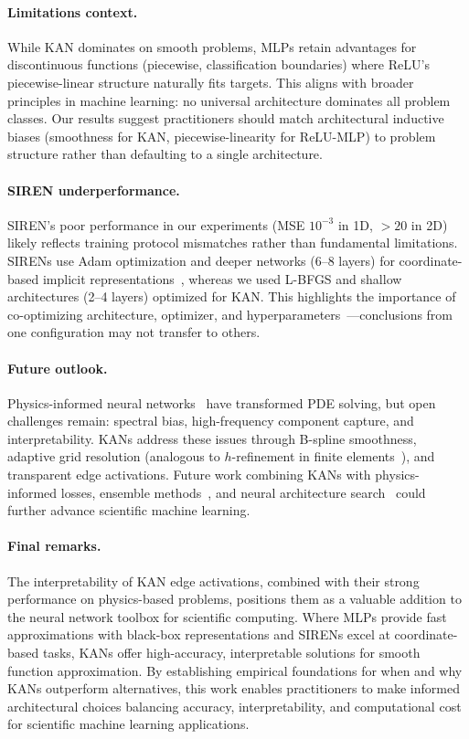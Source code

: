 \documentclass[11pt,a4paper]{article}
\begin{document}
\paragraph{Limitations context.} While KAN dominates on smooth problems, MLPs retain advantages for discontinuous functions (piecewise, classification boundaries) where ReLU's piecewise-linear structure naturally fits targets. This aligns with broader principles in machine learning: no universal architecture dominates all problem classes. Our results suggest practitioners should match architectural inductive biases (smoothness for KAN, piecewise-linearity for ReLU-MLP) to problem structure rather than defaulting to a single architecture.

\paragraph{SIREN underperformance.} SIREN's poor performance in our experiments (MSE $10^{-3}$ in 1D, $>20$ in 2D) likely reflects training protocol mismatches rather than fundamental limitations. SIRENs use Adam optimization and deeper networks (6--8 layers) for coordinate-based implicit representations~\citep{sitzmann2020implicit}, whereas we used L-BFGS and shallow architectures (2--4 layers) optimized for KAN. This highlights the importance of co-optimizing architecture, optimizer, and hyperparameters~\citep{krishnapriyan2021characterizing}—conclusions from one configuration may not transfer to others.

\paragraph{Future outlook.} Physics-informed neural networks~\citep{raissi2019physics} have transformed PDE solving, but open challenges remain: spectral bias, high-frequency component capture, and interpretability. KANs address these issues through B-spline smoothness, adaptive grid resolution (analogous to $h$-refinement in finite elements~\citep{huang2011adaptive}), and transparent edge activations. Future work combining KANs with physics-informed losses, ensemble methods~\citep{jaderberg2017population, dietterich2000ensemble}, and neural architecture search~\citep{zoph2017neural} could further advance scientific machine learning.

\paragraph{Final remarks.} The interpretability of KAN edge activations, combined with their strong performance on physics-based problems, positions them as a valuable addition to the neural network toolbox for scientific computing. Where MLPs provide fast approximations with black-box representations and SIRENs excel at coordinate-based tasks, KANs offer high-accuracy, interpretable solutions for smooth function approximation. By establishing empirical foundations for when and why KANs outperform alternatives, this work enables practitioners to make informed architectural choices balancing accuracy, interpretability, and computational cost for scientific machine learning applications.
\end{document}
